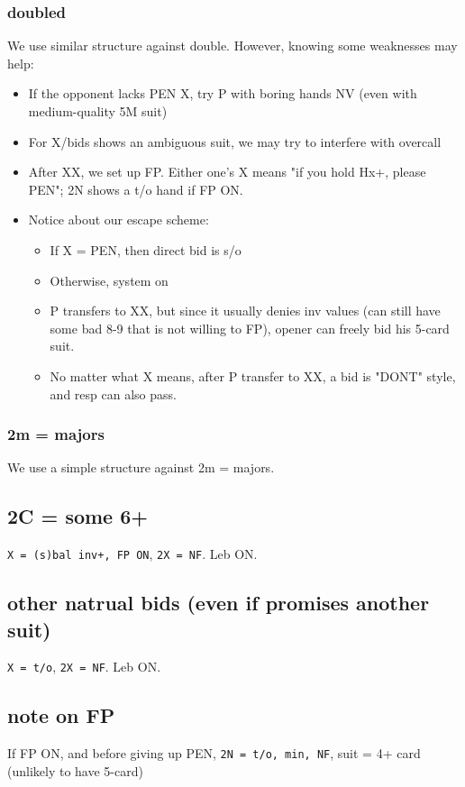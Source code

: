 \subsubsection{doubled}

We use similar structure against double. However, knowing some weaknesses may help:

\begin{itemize}
    \setlength\itemsep{0pt}
    \item If the opponent lacks PEN X, try P with boring hands NV (even with medium-quality 5M suit)
    \item For X/bids shows an ambiguous suit, we may try to interfere with overcall
    \item After XX, we set up FP. Either one's X means "if you hold Hx+, please PEN"; 2N shows a t/o hand if FP ON.
    \item Notice about our escape scheme:
        \begin{itemize}
            \setlength\itemsep{0pt}
            \item If X = PEN, then direct bid is s/o
            \item Otherwise, system on
            \item P transfers to XX, but since it usually denies inv values (can still have some bad 8-9 that is not willing to FP), opener can freely bid his 5-card suit.
            \item No matter what X means, after P transfer to XX, a bid is "DONT" style, and resp can also pass.
        \end{itemize}
\end{itemize}


\subsubsection{2m = majors}

We use a simple structure against 2m = majors.



\subsection{2C = some 6+}

\texttt{X = (s)bal inv+, FP ON}, \texttt{2X = NF}. Leb ON.

\subsection{other natrual bids (even if promises another suit)}

\texttt{X = t/o}, \texttt{2X = NF}. Leb ON.

\subsection{note on FP}

If FP ON, and before giving up PEN, \texttt{2N = t/o, min, NF}, suit = 4+ card (unlikely to have 5-card)
